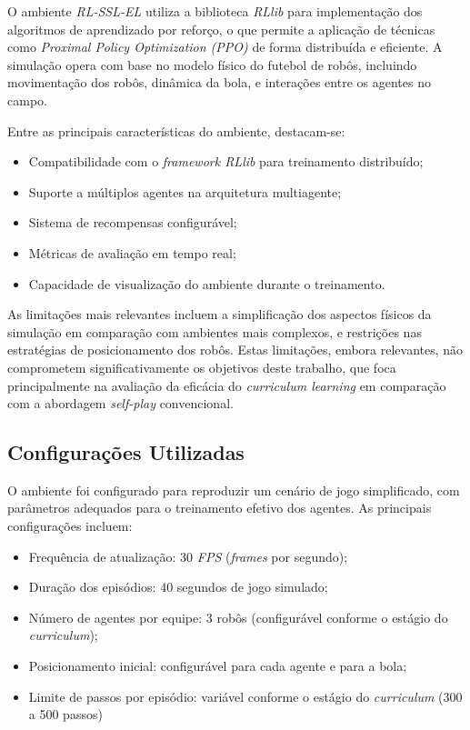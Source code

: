 O ambiente \textit{RL-SSL-EL} utiliza a biblioteca \textit{RLlib} para implementação dos algoritmos de aprendizado por reforço, o que permite a aplicação de técnicas como \textit{Proximal Policy Optimization (PPO)} de forma distribuída e eficiente. A simulação opera com base no modelo físico do futebol de robôs, incluindo movimentação dos robôs, dinâmica da bola, e interações entre os agentes no campo.

Entre as principais características do ambiente, destacam-se:

\begin{itemize}
    \item Compatibilidade com o \textit{framework RLlib} para treinamento distribuído;
    \item Suporte a múltiplos agentes na arquitetura multiagente;
    \item Sistema de recompensas configurável;
    \item Métricas de avaliação em tempo real;
    \item Capacidade de visualização do ambiente durante o treinamento.
\end{itemize}

As limitações mais relevantes incluem a simplificação dos aspectos físicos da simulação em comparação com ambientes mais complexos, e restrições nas estratégias de posicionamento dos robôs. Estas limitações, embora relevantes, não comprometem significativamente os objetivos deste trabalho, que foca principalmente na avaliação da eficácia do \textit{curriculum learning} em comparação com a abordagem \textit{self-play} convencional.

\subsection{Configurações Utilizadas}

O ambiente foi configurado para reproduzir um cenário de jogo simplificado, com parâmetros adequados para o treinamento efetivo dos agentes. As principais configurações incluem:

\begin{itemize}
    \item Frequência de atualização: 30 \textit{FPS} (\textit{frames} por segundo);
    \item Duração dos episódios: 40 segundos de jogo simulado;
    \item Número de agentes por equipe: 3 robôs (configurável conforme o estágio do \textit{curriculum});
    \item Posicionamento inicial: configurável para cada agente e para a bola;
    \item Limite de passos por episódio: variável conforme o estágio do \textit{curriculum} (300 a 500 passos)
\end{itemize}

